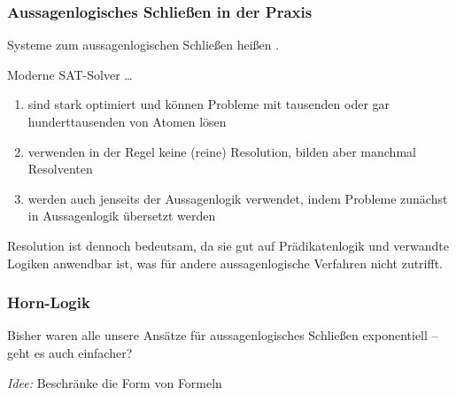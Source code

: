 \documentclass[onlymath]{beamer}
\begin{document}
\begin{frame}\frametitle{Aussagenlogisches Schließen in der Praxis}

Systeme zum aussagenlogischen Schließen heißen .
\bigskip

Moderne SAT-Solver \ldots
\begin{enumerate}[$\ldots$]
\item sind \alert{stark optimiert} und können Probleme mit tausenden oder gar hunderttausenden von Atomen lösen
\item verwenden in der Regel \alert{keine (reine) Resolution}, bilden aber manchmal Resolventen
\item werden auch \alert{jenseits der Aussagenlogik} verwendet, indem Probleme zunächst in Aussagenlogik übersetzt werden
\end{enumerate}\bigskip

Resolution ist dennoch bedeutsam, da sie gut auf Prädikatenlogik und verwandte Logiken anwendbar ist, was für andere aussagenlogische Verfahren nicht zutrifft.

\end{frame}


\begin{frame}\frametitle{Horn-Logik}

Bisher waren alle unsere Ansätze für aussagenlogisches Schließen exponentiell -- geht es auch einfacher?
\bigskip\pause

\emph{Idee:} Beschränke die Form von Formeln
\bigskip


\pause
{}

\end{frame}
\end{document}
